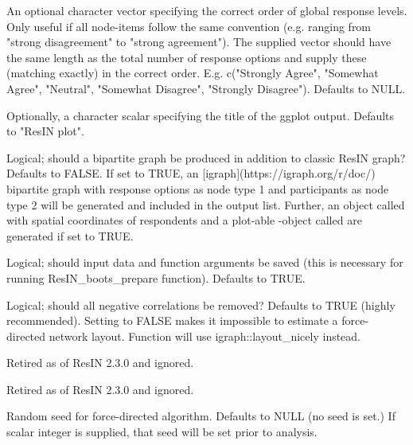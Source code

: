 \documentclass[a4paper]{book}
\begin{document}
\begin{Arguments}
\begin{ldescription}
\item[\code{response\_levels}] An optional character vector specifying the correct order of global response levels. Only useful if all node-items follow the same convention (e.g. ranging from "strong disagreement" to "strong agreement"). The supplied vector should have the same length as the total number of response options and supply these (matching exactly) in the correct order. E.g. c("Strongly Agree", "Somewhat Agree", "Neutral", "Somewhat Disagree", "Strongly Disagree"). Defaults to NULL.

\item[\code{plot\_title}] Optionally, a character scalar specifying the title of the ggplot output. Defaults to "ResIN plot".

\item[\code{bipartite}] Logical; should a bipartite graph be produced in addition to classic ResIN graph? Defaults to FALSE. If set to TRUE, an  [igraph](https://igraph.org/r/doc/) bipartite graph with response options as node type 1 and participants as node type 2 will be generated and included in the output list. Further, an object called  with spatial coordinates of respondents and a plot-able -object called  are generated if set to TRUE.

\item[\code{save\_input}] Logical; should input data and function arguments be saved (this is necessary for running ResIN\_boots\_prepare function). Defaults to TRUE.

\item[\code{remove\_negative}] Logical; should all negative correlations be removed? Defaults to TRUE (highly recommended). Setting to FALSE makes it impossible to estimate a force-directed network layout. Function will use igraph::layout\_nicely instead.

\item[\code{EBICglasso}] Retired as of ResIN 2.3.0 and ignored.

\item[\code{EBICglasso\_arglist}] Retired as of ResIN 2.3.0 and ignored.

\item[\code{seed}] Random seed for force-directed algorithm. Defaults to NULL (no seed is set.) If scalar integer is supplied, that seed will be set prior to analysis.
\end{ldescription}
\end{Arguments}
%
\end{document}
